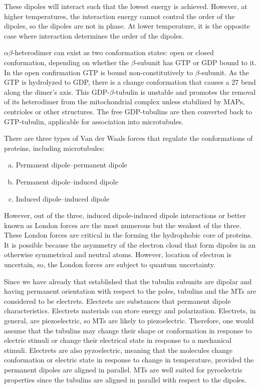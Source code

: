 \documentclass[letterpaper,final,times]{cas-dc}
\numberwithin{equation}{section}
\begin{document}
These dipoles will interact such that the lowest energy is achieved. However, at higher temperatures, the interaction energy cannot control the order of the dipoles, so the dipoles are not in phase. At lower temperature, it is the opposite case where interaction determines the
order of the dipoles.

$\alpha\beta$-heterodimer can exist as two conformation states: open or closed conformation, depending on whether the $\beta$-subunit has GTP or GDP bound to it. In the open confirmation GTP is bound non-constitutively to $\beta$-subunit. As the GTP is hydrolyzed to GDP, there is a change conformation that causes a 27 bend along the dimer’s axis. This GDP-$\beta$-tubulin is unstable and promotes the removal of its heterodimer from the mitochondrial complex unless stabilized by MAPs, centrioles or other structures\citep{7}. The free GDP-tubulins are then converted back to GTP-tubulin, applicable for association into microtubules.

There are three types of Van der Waals forces that regulate the conformations of proteins,  including microtubules:
\begin{enumerate}[a)]
    \item Permanent dipole–permanent dipole
    \item Permanent dipole–induced dipole
    \item Induced dipole–induced dipole
\end{enumerate}

However, out of the three, induced dipole-induced dipole interactions or better known as
London forces are the most numerous but the weakest of the three. These London forces are
critical in the forming the hydrophobic core of proteins. It is possible because the asymmetry
of the electron cloud that form dipoles in an otherwise symmetrical and neutral atoms. However, location of electron is uncertain, so, the London forces are subject to quantum uncertainty\citep{4}.

Since we have already that established that the tubulin subunits are dipolar and having permanent orientation with respect to the poles, tubulins and the MTs are considered to be electrets. Electrets are substances that permanent dipole characteristics\citep{27}. Electrets materials can store energy and polarization. Electrets, in general, are piezoelectric, so MTs are likely to piezoelectric. Therefore, one would assume that the tubulins may change their shape or conformation in response to electric stimuli or change their electrical state in response to a mechanical stimuli\citep{27}. Electrets are also pyzoelectric, meaning that the molecules change conformation or electric state in response to change in temperature, provided the permanent dipoles are aligned in parallel. MTs are well suited for pyroelectric properties since the tubulins are aligned in parallel with respect to the dipoles.
\end{document}
